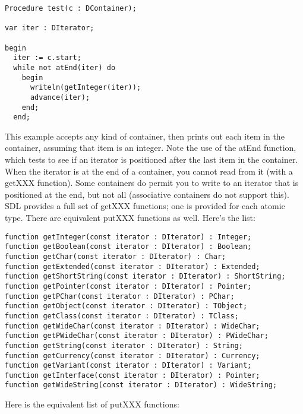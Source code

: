 \documentclass{report}
\begin{document}
\begin{lstlisting}
Procedure test(c : DContainer);

var iter : DIterator;

begin
  iter := c.start;
  while not atEnd(iter) do
    begin
      writeln(getInteger(iter));
      advance(iter);
    end;
  end;
\end{lstlisting}

This example accepts any kind of container, then prints out each item in the
container, assuming that item is an integer. Note the use of the atEnd
function, which tests to see if an iterator is positioned after the last
item in the container.  When the iterator is at the end of a container, you
cannot read from it (with a getXXX function).  Some containers do permit you
to write to an iterator that is positioned at the end, but not all
(associative containers do not support this). SDL provides a full set of
getXXX functions; one is provided for each atomic type. There are equivalent
putXXX functions as well. Here's the list:

\begin{lstlisting}
function getInteger(const iterator : DIterator) : Integer;
function getBoolean(const iterator : DIterator) : Boolean;
function getChar(const iterator : DIterator) : Char;
function getExtended(const iterator : DIterator) : Extended;
function getShortString(const iterator : DIterator) : ShortString;
function getPointer(const iterator : DIterator) : Pointer;
function getPChar(const iterator : DIterator) : PChar;
function getObject(const iterator : DIterator) : TObject;
function getClass(const iterator : DIterator) : TClass;
function getWideChar(const iterator : DIterator) : WideChar;
function getPWideChar(const iterator : DIterator) : PWideChar;
function getString(const iterator : DIterator) : String;
function getCurrency(const iterator : DIterator) : Currency;
function getVariant(const iterator : DIterator) : Variant;
function getInterface(const iterator : DIterator) : Pointer;
function getWideString(const iterator : DIterator) : WideString;
\end{lstlisting}

Here is the equivalent list of putXXX functions:
\end{document}
